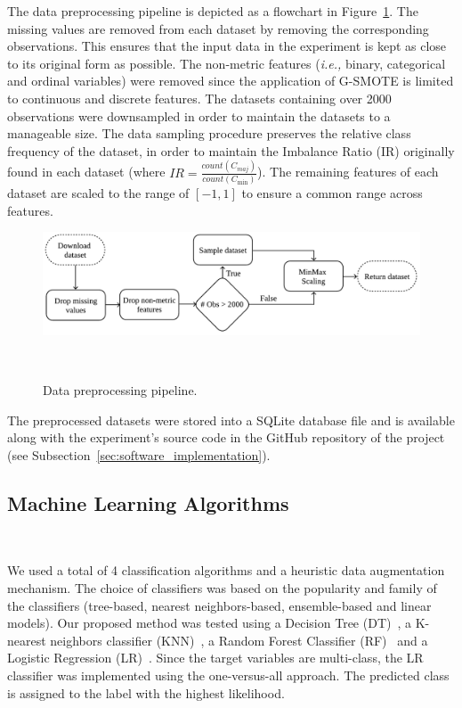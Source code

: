 \documentclass[preprint, 12pt]{elsarticle}
\begin{document}
The data preprocessing pipeline is depicted as a flowchart in
Figure~\ref{fig:data_preprocessing}. The missing values are removed from each
dataset by removing the corresponding observations. This ensures that the
input data in the experiment is kept as close to its original form as
possible. The non-metric features (\textit{i.e.,} binary, categorical and
ordinal variables) were removed since the application of G-SMOTE is limited to
continuous and discrete features. The datasets containing over 2000
observations were downsampled in order to maintain the datasets to a
manageable size. The data sampling procedure preserves the relative class
frequency of the dataset, in order to maintain the Imbalance Ratio (IR)
originally found in each dataset (where $IR =
\frac{count(C_{maj})}{count(C_{\min})}$). The remaining features of each
dataset are scaled to the range of $[-1, 1]$ to ensure a common range across
features.

\begin{figure}[H]
	\centering
	\includegraphics[width=1\linewidth]{../analysis/data_preprocessing}
    \caption{%
        Data preprocessing pipeline.
    }~\label{fig:data_preprocessing}
\end{figure}

The preprocessed datasets were stored into a SQLite database file and is
available along with the experiment's source code in the GitHub repository of
the project (see Subsection~\ref{sec:software_implementation}).
 
\subsection{Machine Learning Algorithms}~\label{sec:machine_learning_algorithms}

We used a total of 4 classification algorithms and a heuristic data
augmentation mechanism. The choice of classifiers was based on the popularity
and family of the classifiers (tree-based, nearest neighbors-based,
ensemble-based and linear models). Our proposed method was tested using a
Decision Tree (DT)~\cite{Wu1975}, a K-nearest neighbors classifier
(KNN)~\cite{Cover1967}, a Random Forest Classifier (RF)~\cite{Ho1995} and a
Logistic Regression (LR)~\cite{Nelder1972}. Since the target variables are
multi-class, the LR classifier was implemented using the one-versus-all
approach. The predicted class is assigned to the label with the highest
likelihood.
 
\end{document}
